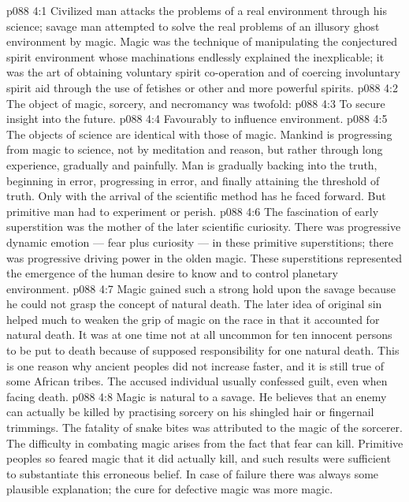 \vs p088 4:1 Civilized man attacks the problems of a real environment through his science; savage man attempted to solve the real problems of an illusory ghost environment by magic. Magic was the technique of manipulating the conjectured spirit environment whose machinations endlessly explained the inexplicable; it was the art of obtaining voluntary spirit co\hyp{}operation and of coercing involuntary spirit aid through the use of fetishes or other and more powerful spirits.
\vs p088 4:2 The object of magic, sorcery, and necromancy was twofold:
\vs p088 4:3 \bibnobreakspace To secure insight into the future.
\vs p088 4:4 \bibnobreakspace Favourably to influence environment.
\vs p088 4:5 \pc The objects of science are identical with those of magic. Mankind is progressing from magic to science, not by meditation and reason, but rather through long experience, gradually and painfully. Man is gradually backing into the truth, beginning in error, progressing in error, and finally attaining the threshold of truth. Only with the arrival of the scientific method has he faced forward. But primitive man had to experiment or perish.
\vs p088 4:6 The fascination of early superstition was the mother of the later scientific curiosity. There was progressive dynamic emotion --- fear plus curiosity --- in these primitive superstitions; there was progressive driving power in the olden magic. These superstitions represented the emergence of the human desire to know and to control planetary environment.
\vs p088 4:7 Magic gained such a strong hold upon the savage because he could not grasp the concept of natural death. The later idea of original sin helped much to weaken the grip of magic on the race in that it accounted for natural death. It was at one time not at all uncommon for ten innocent persons to be put to death because of supposed responsibility for one natural death. This is one reason why ancient peoples did not increase faster, and it is still true of some African tribes. The accused individual usually confessed guilt, even when facing death.
\vs p088 4:8 Magic is natural to a savage. He believes that an enemy can actually be killed by practising sorcery on his shingled hair or fingernail trimmings. The fatality of snake bites was attributed to the magic of the sorcerer. The difficulty in combating magic arises from the fact that fear can kill. Primitive peoples so feared magic that it did actually kill, and such results were sufficient to substantiate this erroneous belief. In case of failure there was always some plausible explanation; the cure for defective magic was more magic.
